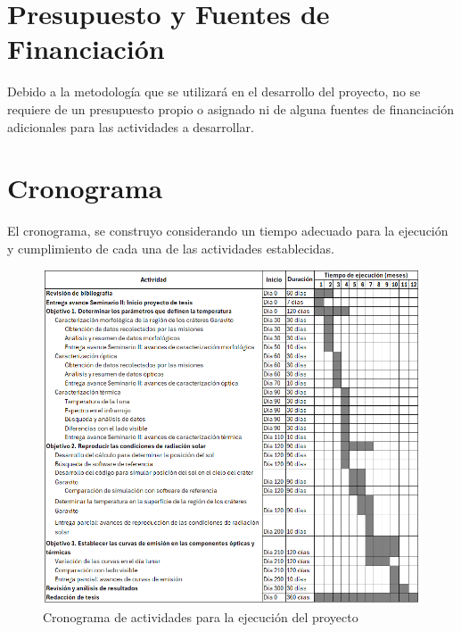 \documentclass[12pt]{article}
\begin{document}
\section{Presupuesto y Fuentes de Financiación}
Debido a la metodología que se utilizará en el desarrollo del proyecto, no se requiere de un presupuesto 
propio o asignado ni de alguna fuentes de financiación adicionales para las actividades a desarrollar.

\section{Cronograma}
El cronograma, se construyo considerando un tiempo adecuado para la ejecución y cumplimiento de cada una 
de las actividades establecidas.
\begin{figure}[H]
    \centering
    \includegraphics[width=1\textwidth]{images/Schedule.png}
    \caption{Cronograma de actividades para la ejecución del proyecto}
    \label{fig:cronograma}
\end{figure}

\newpage
\printbibliography
\end{document}
